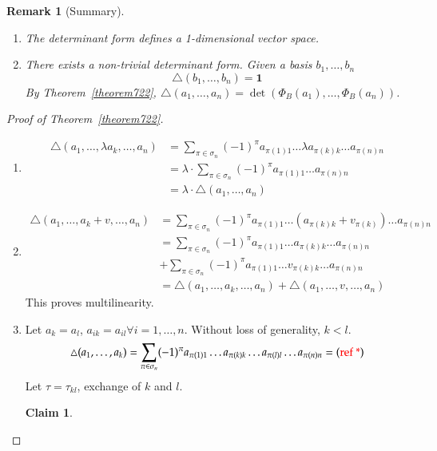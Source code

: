 \documentclass[a4paper]{article}
\numberwithin{lecref}{section}
\newtheorem*{claim}{Claim}
\newtheorem*{Remark}{Remark}
\begin{document}
\begin{Remark}[Summary]
  \begin{enumerate}
    \item The determinant form defines a 1-dimensional vector space.
    \item There exists a non-trivial determinant form. Given a basis $b_1, \dots, b_n$
      \[ \triangle(b_1, \dots, b_n) = \mathbf 1 \]
      By Theorem~\ref{theorem722}, $\triangle(a_1, \dots, a_n) = \det(\Phi_B(a_1), \dots, \Phi_B(a_n))$.
  \end{enumerate}
\end{Remark}

\begin{proof}[Proof of Theorem~\ref{theorem722}]
  \begin{enumerate}
    \item
      \begin{align*}
        \triangle(a_1, \dots, \lambda a_k, \dots, a_n)
          &= \sum_{\pi \in \sigma_n} (-1)^{\pi} a_{\pi(1)1} \dots \lambda a_{\pi(k) k} \dots a_{\pi(n) n} \\
          &= \lambda \cdot \sum_{\pi \in \sigma_n} (-1)^\pi a_{\pi(1) 1} \dots a_{\pi(n) n} \\
          &= \lambda \cdot \triangle(a_1, \dots, a_n)
      \end{align*}
    \item
      \begin{align*}
        \triangle(a_1, \dots, a_k + v, \dots, a_n)
          &= \sum_{\pi \in \sigma_n} (-1)^\pi a_{\pi(1) 1} \dots (a_{\pi(k) k} + v_{\pi(k)}) \dots a_{\pi(n) n} \\
          &= \sum_{\pi \in \sigma_n} (-1)^\pi a_{\pi(1) 1} \dots a_{\pi(k) k} \dots a_{\pi(n) n} \\
          &+ \sum_{\pi \in \sigma_n} (-1)^\pi a_{\pi(1) 1} \dots v_{\pi(k) k} \dots a_{\pi(n) n} \\
          &= \triangle(a_1, \dots, a_k, \dots, a_n) + \triangle(a_1, \dots, v, \dots, a_n)
      \end{align*}
      This proves multilinearity.
    \item
      Let $a_k = a_l$, $a_{ik} = a_{il} \forall i = 1, \dots, n$.
      Without loss of generality, $k < l$.
      \[ \triangle(a_1, \dots, a_k) = \sum_{\pi \in \sigma_n} (-1)^\pi a_{\pi(1) 1} \dots a_{\pi(k) k} \dots a_{\pi(l) l} \dots a_{\pi(n) n} = (\text{\color{red} ref *}) \]
      Let $\tau = \tau_{kl}$, exchange of $k$ and $l$.
      \begin{claim}

\end{claim}
\end{enumerate}
\end{proof}
\end{document}
